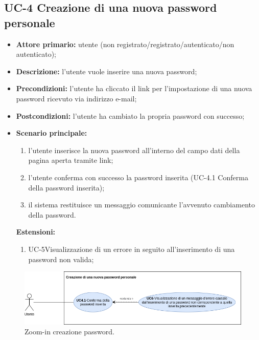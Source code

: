 \subsection{UC-4 Creazione di una nuova password personale}
\begin{itemize}
	\item \textbf{Attore primario:} utente (non registrato/registrato/autenticato/non autenticato);

	\item \textbf{Descrizione:} l'utente vuole inserire una nuova password;

	\item \textbf{Precondizioni:} l'utente ha cliccato il link per l'impostazione di una nuova password ricevuto via indirizzo e-mail;

	\item \textbf{Postcondizioni:} l'utente ha cambiato la propria password con successo;

	\item \textbf{Scenario principale:}
	      \begin{enumerate}
		      \item l'utente inserisce la nuova password all'interno del campo dati della pagina aperta tramite link;
		      \item l'utente conferma con successo la password inserita (UC-4.1 Conferma della password inserita);
		      \item il sistema restituisce un messaggio comunicante l'avvenuto cambiamento della password.
	      \end{enumerate}

	      \textbf{Estensioni:}
	      \begin{enumerate}
		      \item UC-5Visualizzazione di un errore in seguito all'inserimento di una password non valida;
	      \end{enumerate}
\end{itemize}

\begin{figure}[H]
	\centering
	\includegraphics[width=\textwidth]{src/CasiDUso/immagini/SottocasoCreazionePassword.png}
	\caption{Zoom-in creazione password.}
\end{figure}

